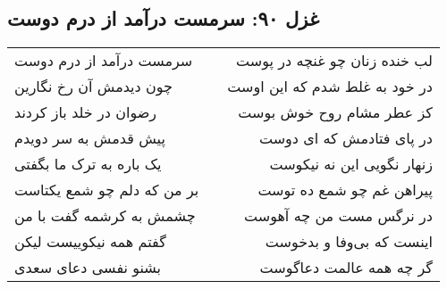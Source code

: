 \begin{center}
\section*{غزل ۹۰: سرمست درآمد از درم دوست}
\label{sec:090}
\begin{longtable}{l p{0.5cm} r}
سرمست درآمد از درم دوست
&&
لب خنده زنان چو غنچه در پوست
\\
چون دیدمش آن رخ نگارین
&&
در خود به غلط شدم که این اوست
\\
رضوان در خلد باز کردند
&&
کز عطر مشام روح خوش بوست
\\
پیش قدمش به سر دویدم
&&
در پای فتادمش که ای دوست
\\
یک باره به ترک ما بگفتی
&&
زنهار نگویی این نه نیکوست
\\
بر من که دلم چو شمع یکتاست
&&
پیراهن غم چو شمع ده توست
\\
چشمش به کرشمه گفت با من
&&
در نرگس مست من چه آهوست
\\
گفتم همه نیکوییست لیکن
&&
اینست که بی‌وفا و بدخوست
\\
بشنو نفسی دعای سعدی
&&
گر چه همه عالمت دعاگوست
\\
\end{longtable}
\end{center}

